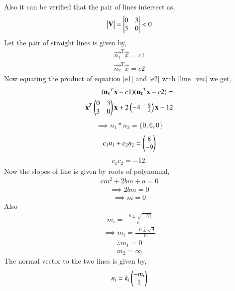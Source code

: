 \documentclass[journal,12pt,twocolumn]{IEEEtran}
\begin{document}
Also it can be verified that the pair of lines intersect as,
\begin{align}
\begin{vmatrix}\mathbf{V}\end{vmatrix} = \begin{vmatrix}0&3\\3&0\end{vmatrix} <0 
\end{align} 
Let the pair of straight lines is given by,
\begin{align}
\vec{n_1}^T\vec{x} = c1
\label{e1}
\end{align}
\begin{align}
\vec{n_2}^T\vec{x} = c2
\label{e2}
\end{align}
Now equating the product of equation \eqref{e1} and \eqref{e2} with \eqref{line_vec} we get,
\begin{align}
(\mathbf{n_1}^T\mathbf{x} - c1)(\mathbf{n_2}^T\mathbf{x} - c2) = \\\mathbf{x}^T\begin{pmatrix}0&3\\3&0\end{pmatrix}\mathbf{x} + 2\begin{pmatrix}-4& \frac{9}{2}\end{pmatrix}\mathbf{x} - 12 
\end{align}
\begin{align}
\implies n_1 * n_2 = \{0,6,0\}
\label{verify}
\end{align}
\begin{align}
c_1n_1+c_2n_2 = \begin{pmatrix}8\\-9\end{pmatrix}
\label{sub1}
\end{align}
\begin{align}
c_1c_2 = -12.
\end{align}
Now the slopes of line is given by roots of polynomial,
\begin{align}
cm^2 + 2bm + a = 0
\end{align} 
\begin{align}
\implies 2bm = 0
\end{align}
\begin{align}
\implies m = 0
\end{align}
Also
\begin{align}
m_i = \frac{-b\pm\sqrt{-|V|}}{c} 
\end{align}
\begin{align}
\implies m_i = \frac{-0\pm\sqrt{9}}{0} 
\end{align}
\begin{align}
\therefore m_1 = 0
\end{align}
\begin{align}
 m_2 = \infty
\end{align}
The normal vector to the two lines is given by,
\begin{align}
n_i = k_i\begin{pmatrix}-m_i\\1\end{pmatrix}
\end{align}
\end{document}
